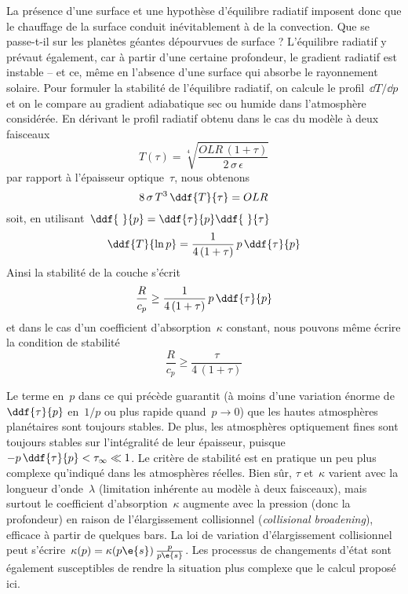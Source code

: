 \sk
La présence d'une surface et une hypothèse d'équilibre radiatif imposent donc que le chauffage de la surface conduit inévitablement à de la convection. Que se passe-t-il sur les planètes géantes dépourvues de surface ? L'équilibre radiatif y prévaut également, car à partir d'une certaine profondeur, le gradient radiatif est instable -- et ce, même en l'absence d'une surface qui absorbe le rayonnement solaire. Pour formuler la stabilité de l'équilibre radiatif, on calcule le profil~$\dd T / \dd p$ et on le compare au gradient adiabatique sec ou humide dans l'atmosphère considérée. En dérivant le profil radiatif obtenu dans le cas du modèle à deux faisceaux
\[ T(\tau) = \sqrt[4]{\frac{OLR\,(1+\tau)}{2\,\sigma\,\epsilon}} \]
\noindent par rapport à l'épaisseur optique~$\tau$, nous obtenons
\[ 8 \, \sigma \, T^3 \, \ddf{T}{\tau} = OLR \]
\noindent soit, en utilisant~$\ddf{~}{p} = \ddf{\tau}{p} \ddf{~}{\tau}$
\[ \ddf{T}{\ln p} = \frac{1}{4\,(1+\tau)} \, p \, \ddf{\tau}{p} \]
Ainsi la stabilité de la couche s'écrit
\[ \frac{R}{c_p} \ge \frac{1}{4\,(1+\tau)} \, p \, \ddf{\tau}{p} \]
\noindent et dans le cas d'un coefficient d'absorption~$\kappa$ constant, nous pouvons même écrire la condition de stabilité
\[ \frac{R}{c_p} \ge \frac{\tau}{4\,(1+\tau)} \]

\sk
Le terme en~$p$ dans ce qui précède guarantit (à moins d'une variation énorme de $\ddf{\tau}{p}$ en~$1/p$ ou plus rapide quand~$p \rightarrow 0$) que les hautes atmosphères planétaires sont toujours stables. De plus, les atmosphères optiquement fines sont toujours stables sur l'intégralité de leur épaisseur, puisque~$-p \, \ddf{\tau}{p} < \tau_\infty \ll 1$. Le critère de stabilité est en pratique un peu plus complexe qu'indiqué dans les atmosphères réelles. Bien sûr, $\tau$ et~$\kappa$ varient avec la longueur d'onde~$\lambda$ (limitation inhérente au modèle à deux faisceaux), mais surtout le coefficient d'absorption~$\kappa$ augmente avec la pression (donc la profondeur) en raison de l'élargissement collisionnel (\emph{collisional broadening}), efficace à partir de quelques bars. La loi de variation d'élargissement collisionnel peut s'écrire~$\kappa(p) = \kappa(p\e{s}) \, \frac{p}{p\e{s}}$. Les processus de changements d'état sont également susceptibles de rendre la situation plus complexe que le calcul proposé ici.

